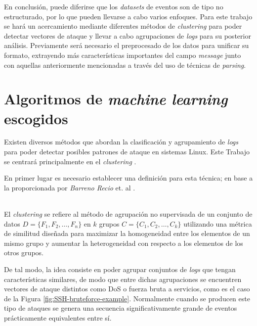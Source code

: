 En conclusión, puede diferirse que los \textit{datasets} de eventos son de tipo no estructurado, por lo que pueden llevarse a cabo varios enfoques. Para este trabajo se hará un acercamiento mediante diferentes métodos de \textit{clustering} para poder detectar vectores de ataque y llevar a cabo agrupaciones de \textit{logs} para su posterior análisis. Previamente será necesario el preprocesado de los datos para unificar su formato, extrayendo más características importantes del campo \textit{message} junto con aquellas anteriormente mencionadas a través del uso de técnicas de \textit{parsing}.

\vspace{5mm}


\section{Algoritmos de \textit{machine learning} escogidos}

Existen diversos métodos que abordan la clasificación y agrupamiento de \textit{logs} para poder detectar posibles patrones de ataque en sistemas Linux. Este Trabajo se centrará principalmente en el \textit{clustering} \cite{Aggarwal2013}. 

En primer lugar es necesario establecer una definición para esta técnica; en base a la proporcionada por \textit{Barreno Recio} et. al \cite{BarrenoRecio2023}.  \\

\begin{definition}
\shorthrule \vspace{0.1cm}
\\
El \textit{clustering} \label{clustering} se refiere al método de agrupación no supervisada de un conjunto de datos \(D = \{F_1, F_2, \ldots, F_n\}\) en \(k\) grupos \(C = \{C_1, C_2, \ldots, C_k\}\) utilizando una métrica de similitud diseñada para maximizar la homogeneidad entre los elementos de un mismo grupo y aumentar la heterogeneidad con respecto a los elementos de los otros grupos.
\\ \vspace{0.1cm}
\fullhrule
\end{definition}


De tal modo, la idea consiste en poder agrupar conjuntos de \textit{logs} que tengan características similares, de modo que entre dichas agrupaciones se encuentren vectores de ataque distintos como \gls{DoS} o fuerza bruta a servicios, como es el caso de la Figura \ref{fig:SSH-bruteforce-example}. Normalmente cuando se producen este tipo de ataques se genera una secuencia significativamente grande de eventos prácticamente equivalentes entre sí.

